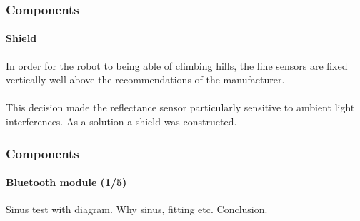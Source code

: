 \documentclass[10pt]{beamer}
\begin{document}

\begin{frame}
\frametitle{Components}
\framesubtitle{Shield}
In order for the robot to being able of climbing hills, the line sensors are fixed vertically well above the recommendations of the manufacturer. \\~\\
This decision made the reflectance sensor particularly sensitive to ambient light interferences. As a solution a shield was constructed. 
\end{frame}


\begin{frame}
\frametitle{Components}
\framesubtitle{Bluetooth module (1/5)}
Sinus test with diagram. Why sinus, fitting etc. Conclusion.
\end{frame}

\end{document}
